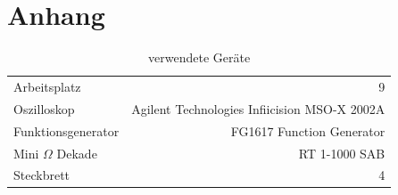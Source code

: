 \documentclass[10pt,a4paper]{scrartcl}
\begin{document}
\pagebreak

\section {Anhang}

\begin{table}[ht!]
    \centering
    \caption{verwendete Geräte} \label{tab:devices}
    \begin{tabular}{lr}
        Arbeitsplatz & 9\\
        Oszilloskop&Agilent Technologies Infiicision MSO-X 2002A\\
        Funktionsgenerator&FG1617 Function Generator\\
        Mini $\Omega$ Dekade&RT 1-1000 SAB\\
        Steckbrett & 4
    \end{tabular}
\end{table}
\end{document}
